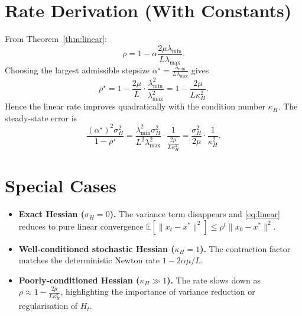 \documentclass[11pt]{article}
\newcommand{\E}{\mathbb{E}}
\begin{document}
\section*{Rate Derivation (With Constants)}
From Theorem~\ref{thm:linear}:
\[
\rho = 1-\alpha\frac{2\mu\lambda_{\min}}{L\lambda_{\max}}.
\]
Choosing the largest admissible stepsize $\alpha^{\star}= \frac{\lambda_{\min}}{L\lambda_{\max}}$ gives
\[
\rho^{\star}=1-\frac{2\mu}{L}\cdot\frac{\lambda_{\min}^{2}}{\lambda_{\max}^{2}}
=1-\frac{2\mu}{L\kappa_{H}^{2}}.
\]
Hence the linear rate improves quadratically with the condition number $\kappa_{H}$. The steady‑state error is
\[
\frac{(\alpha^{\star})^{2}\sigma_{H}^{2}}{1-\rho^{\star}}
= \frac{\lambda_{\min}^{2}\sigma_{H}^{2}}{L^{2}\lambda_{\max}^{2}}\cdot\frac{1}{\frac{2\mu}{L\kappa_{H}^{2}}}
= \frac{\sigma_{H}^{2}}{2\mu}\cdot\frac{1}{\kappa_{H}^{2}}.
\]

\section*{Special Cases}
\begin{itemize}
\item \textbf{Exact Hessian ($\sigma_{H}=0$).} The variance term disappears and \eqref{eq:linear} reduces to pure linear convergence $\E[\|x_{t}-x^{*}\|^{2}]\le\rho^{t}\|x_{0}-x^{*}\|^{2}$.
\item \textbf{Well‑conditioned stochastic Hessian ($\kappa_{H}=1$).} The contraction factor matches the deterministic Newton rate $1-2\alpha\mu/L$.
\item \textbf{Poorly‑conditioned Hessian ($\kappa_{H}\gg1$).} The rate slows down as $\rho\approx1-\frac{2\mu}{L\kappa_{H}^{2}}$, highlighting the importance of variance reduction or regularisation of $H_{t}$.
\end{itemize}
\end{document}
